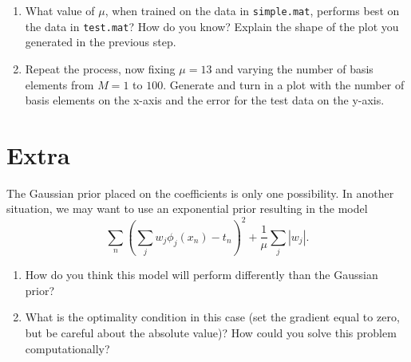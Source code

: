 \documentclass[11pt,noanswers,addpoints]{exam}
\begin{document}
\begin{enumerate}
\item  What value of $\mu$, when trained on the data in \texttt{simple.mat}, performs best on the data in
\texttt{test.mat}? How do you know? Explain the shape of the plot you generated in the previous step.

\item  Repeat the process, now fixing $\mu=13$ and varying the number of basis
elements from $M=1$ to $100$. Generate and turn in a plot with the number of basis elements on the x-axis and
the error for the test data on the y-axis.

\end{enumerate}

\section{Extra}

The Gaussian prior placed on the coefficients is only one possibility. In another situation, we may
want to use an exponential prior resulting in the model
$$\sum_n \left(\sum_j w_j \phi_j(x_n) - t_n\right)^2 + \frac{1}{\mu}\sum_j |w_j|.$$

\begin{enumerate}
\item How do you think this model will perform differently than the Gaussian prior?
\item What is the optimality condition in this case (set the gradient equal to zero, but
be careful about the absolute value)? How could you solve this problem computationally?
\end{enumerate}
\end{document}
